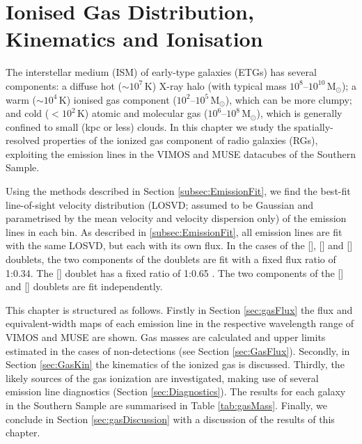 \chapter{Ionised Gas Distribution, Kinematics and Ionisation}
	\label{cha:gas}
The interstellar medium (ISM) of early-type galaxies (ETGs) has several components: a diffuse hot ($\sim 10^7 \, \mathrm{K}$) X-ray halo (with typical mass $10^8$--$10^{10} \, \mathrm{M_\odot}$); a warm ($\sim 10^4 \, \mathrm{K}$) ionised gas component ($10^2$--$10^5 \, \mathrm{M_\odot}$), which can be more clumpy; and cold ($<10^2 \, \mathrm{K}$) atomic and molecular gas ($10^6$--$10^8 \, \mathrm{M_\odot}$), which is generally confined to small (kpc or less) clouds. In this chapter we study the spatially-resolved properties of the ionized gas component of radio galaxies (RGs), exploiting the emission lines in the VIMOS and MUSE datacubes of the Southern Sample.

Using the methods described in Section \ref{subsec:EmissionFit}, we find the best-fit line-of-sight velocity distribution (LOSVD; assumed to be Gaussian and parametrised by the mean velocity and velocity dispersion only) of the emission lines in each bin. As described in \ref{subsec:EmissionFit}, all emission lines are fit with the same LOSVD, but each with its own flux. In the cases of the [], [] and [] doublets, the two components of the doublets are fit with a fixed flux ratio of 1:0.34. The [] doublet has a fixed ratio of 1:0.65 \citep{Safier1992}. The two components of the [] and [] doublets are fit independently.

This chapter is structured as follows. Firstly in Section \ref{sec:gasFlux} the flux and equivalent-width maps of each emission line in the respective wavelength range of VIMOS and MUSE are shown. Gas masses are calculated and upper limits estimated in the cases of non-detections (see Section \ref{sec:GasFlux}). Secondly, in Section \ref{sec:GasKin} the kinematics of the ionized gas is discussed. Thirdly, the likely sources of the gas ionization are investigated, making use of several emission line diagnostics (Section \ref{sec:Diagnostics}). The results for each galaxy in the Southern Sample are summarised in Table \ref{tab:gasMass}. Finally, we conclude in Section \ref{sec:gasDiscussion} with a discussion of the results of this chapter.


